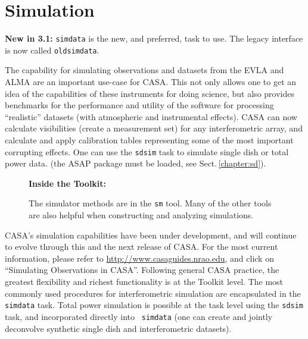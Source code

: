 
\chapter[Simulation]{Simulation}
\label{chapter:sim}

{\bfseries New in 3.1:} {\tt simdata} is the new, and preferred,
task to use.  The legacy interface is now called {\tt oldsimdata}.

The capability for simulating observations and datasets from the EVLA
and ALMA are an important use-case for CASA.  This not only allows one
to get an idea of the capabilities of these instruments for doing
science, but also provides benchmarks for the performance and utility
of the software for processing ``realistic'' datasets (with
atmospheric and instrumental effects).  CASA can now calculate
visibilities (create a measurement set) for any interferometric array,
and calculate and apply calibration tables representing some of the
most important corrupting effects.  One can use the {\tt sdsim} task
to simulate single dish or total power data.  (the ASAP package must
be loaded, see Sect.\,\ref{chapter:sd}).

\begin{wrapfigure}{r}{2.5in}
 \begin{boxedminipage}{2.5in}
    \centerline{\bf Inside the Toolkit:}
    The simulator methods are in the {\tt sm} tool.
    Many of the other tools are also helpful when
    constructing and analyzing simulations.
 \end{boxedminipage}
\end{wrapfigure}

CASA's simulation capabilities have been under development, and will
continue to evolve through this and the next release of CASA.
For the most current information, please refer to
\url{http://www.casaguides.nrao.edu}, and click on ``Simulating
Observations in CASA''.
%
Following general CASA practice, the greatest flexibility and richest
functionality is at the Toolkit level.  The most commonly used
procedures for interferometric simulation are encapsulated in the {\tt
simdata} task.  Total power simulation is possible at the task level
using the {\tt sdsim} task, and incorporated directly into {\tt
simdata} (one can create and jointly deconvolve synthetic single dish
and interferometric datasets).

